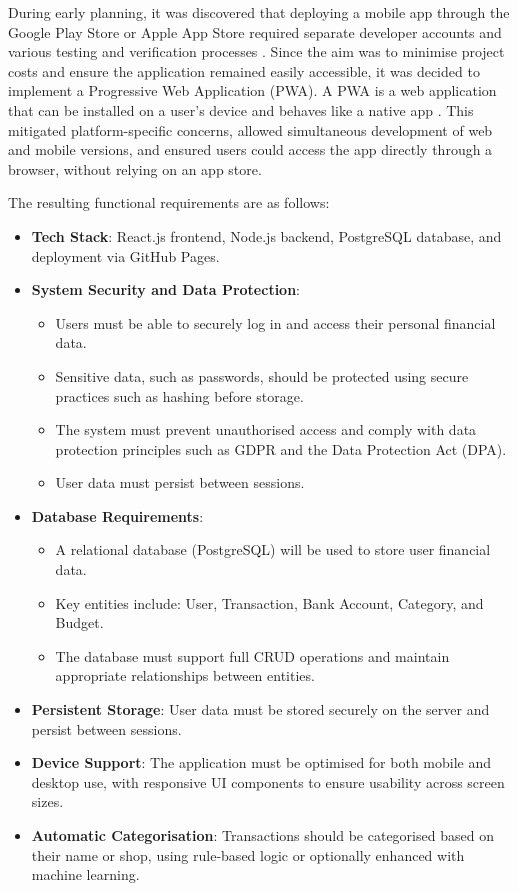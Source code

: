 \documentclass{l4proj}
\begin{document}
During early planning, it was discovered that deploying a mobile app through the Google Play Store or Apple App Store required separate developer accounts and various testing and verification processes \citep{google_play_account, apple_developer_account}. Since the aim was to minimise project costs and ensure the application remained easily accessible, it was decided to implement a Progressive Web Application (PWA). A PWA is a web application that can be installed on a user’s device and behaves like a native app \citep{mozilla_progressive_2025}. This mitigated platform-specific concerns, allowed simultaneous development of web and mobile versions, and ensured users could access the app directly through a browser, without relying on an app store.

The resulting functional requirements are as follows:

\begin{itemize}
    \item \textbf{Tech Stack}: React.js frontend, Node.js backend, PostgreSQL database, and deployment via GitHub Pages.
    \item \textbf{System Security and Data Protection}:
    \begin{itemize}
        \item Users must be able to securely log in and access their personal financial data.
        \item Sensitive data, such as passwords, should be protected using secure practices such as hashing before storage.
        \item The system must prevent unauthorised access and comply with data protection principles such as GDPR and the Data Protection Act (DPA).
        \item User data must persist between sessions.
    \end{itemize}
    \item \textbf{Database Requirements}:
    \begin{itemize}
        \item A relational database (PostgreSQL) will be used to store user financial data.
        \item Key entities include: User, Transaction, Bank Account, Category, and Budget.
        \item The database must support full CRUD operations and maintain appropriate relationships between entities.
    \end{itemize}
    \item \textbf{Persistent Storage}: User data must be stored securely on the server and persist between sessions.
    \item \textbf{Device Support}: The application must be optimised for both mobile and desktop use, with responsive UI components to ensure usability across screen sizes.
    \item \textbf{Automatic Categorisation}: Transactions should be categorised based on their name or shop, using rule-based logic or optionally enhanced with machine learning.
\end{itemize}
\end{document}
